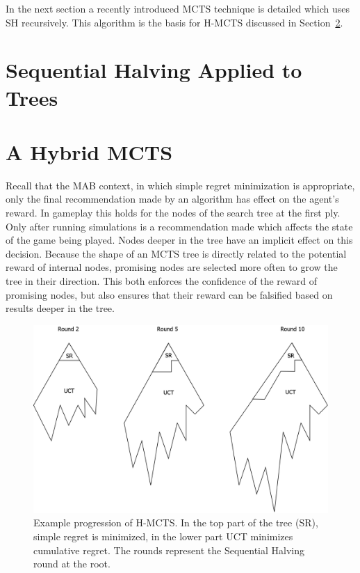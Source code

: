 \documentclass[a4paper]{llncs}
\begin{document}
In the next section a recently introduced MCTS technique is detailed which uses SH recursively. This algorithm is the basis for H-MCTS discussed in Section~\ref{sec:h-mcts}.

\section{Sequential Halving Applied to Trees}
\label{sec:shot}

\section{A Hybrid MCTS}
\label{sec:h-mcts}

Recall that the MAB context, in which simple regret minimization is appropriate, only the final recommendation made by an algorithm has effect on the agent's reward. In gameplay this holds for the nodes of the search tree at the first ply. Only after running simulations is a recommendation made which affects the state of the game being played. Nodes deeper in the tree have an implicit effect on this decision. Because the shape of an MCTS tree is directly related to the potential reward of internal nodes, promising nodes are selected more often to grow the tree in their direction. This both enforces the confidence of the reward of promising nodes, but also ensures that their reward can be falsified based on results deeper in the tree.

\begin{figure}[ht]
	\centering
	\includegraphics[width=.8\textwidth]{img/H-MCTS.png}
	\caption{Example progression of H-MCTS. In the top part of the tree (SR), simple regret is minimized, in the lower part UCT minimizes cumulative regret. The rounds represent the Sequential Halving round at the root.}
	\label{fig:h-mcts_trees}
\end{figure}
\end{document}
